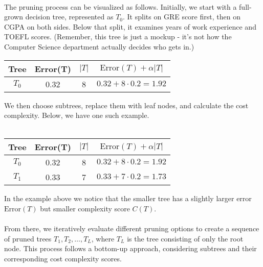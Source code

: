 \documentclass[10pt,a4paper]{report}
\begin{document}
\paragraph{}The pruning process can be visualized as follows. Initially, we start with a full-grown decision tree, represented as $T_0$. It splits on GRE score first, then on CGPA on both sides. Below that split, it examines years of work experience and TOEFL scores. (Remember, this tree is just a mockup - it's not how the Computer Science department actually decides who gets in.)
\begin{center}
\begin{tabular}{|c|c|c|c|}
\hline
Tree & Error(T) & $|T|$ & $\textrm{Error}(T)+\alpha|T|$\\\hline
$T_0$ & 0.32 & 8 & $0.32+8\cdot0.2=1.92$\\\hline
\end{tabular}
\end{center}
We then choose subtrees, replace them with leaf nodes, and calculate the cost complexity. Below, we have one such example.\\
\\
\begin{center}
\begin{tabular}{|c|c|c|c|}
\hline
Tree & Error(T) & $|T|$ & $\textrm{Error}(T)+\alpha|T|$\\\hline
$T_0$ & 0.32 & 8 & $0.32+8\cdot0.2=1.92$\\\hline
$T_1$ & 0.33 & 7 & $0.33+7\cdot0.2=1.73$\\\hline
\end{tabular}
\end{center}
In the example above we notice that the smaller tree has a slightly larger error $\textrm{Error}(T)$ but smaller complexity score $C(T)$.
\paragraph{}From there, we iteratively evaluate different pruning options to create a sequence of pruned trees $T_1, T_2, \dots, T_L$, where $T_L$ is the tree consisting of only the root node. This process follows a bottom-up approach, considering subtrees and their corresponding cost complexity scores.
\end{document}
